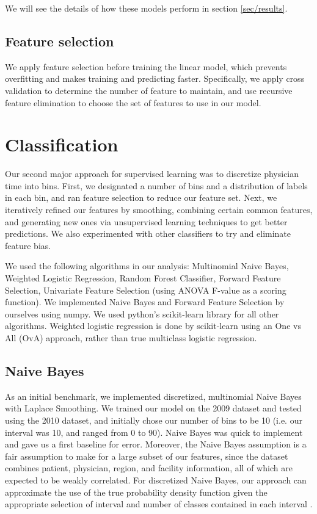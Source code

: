 \documentclass[english]{article}
\begin{document}
We will see the details of how these models perform in section \ref{sec/results}.

\subsection{Feature selection}

We apply feature selection before training the linear model, which prevents overfitting and makes training and predicting faster. Specifically, we apply cross validation to determine the number of feature to maintain, and use recursive feature elimination to choose the set of features to use in our model.


\section{Classification}
\label{sec/clf}

Our second major approach for supervised learning was to discretize physician time into bins.
First, we designated a number of bins and a distribution of labels in each bin, and ran feature selection to reduce our feature set.
Next, we iteratively refined our features by smoothing, combining certain common features, and generating new ones via unsupervised learning techniques to get better predictions.
We also experimented with other classifiers to try and eliminate feature bias.

We used the following algorithms in our analysis:
Multinomial Naive Bayes,
Weighted Logistic Regression,
Random Forest Classifier,
Forward Feature Selection,
Univariate Feature Selection (using ANOVA F-value as a scoring function).
We implemented Naive Bayes and Forward Feature Selection by ourselves using numpy. We used python’s scikit-learn library \cite{pedregosa2011scikit} for all other algorithms. Weighted logistic regression is done by scikit-learn using an One vs All (OvA) approach, rather than true multiclass logistic regression.

\subsection{Naive Bayes}

As an initial benchmark, we implemented discretized, multinomial Naive Bayes with Laplace Smoothing.
We trained our model on the 2009 dataset and tested using the 2010 dataset, and initially chose our number of bins to be 10 (i.e. our interval was 10, and ranged from 0 to 90).
Naive Bayes was quick to implement and gave us a first baseline for error.
Moreover, the Naive Bayes assumption is a fair assumption to make for a large subset of our features, since the dataset combines patient, physician, region, and facility information, all of which are expected to be weakly correlated.
For discretized Naive Bayes, our approach can approximate the use of the true probability density function given the appropriate selection of interval and number of classes contained in each interval \cite{yang2009discretization}.
\end{document}
